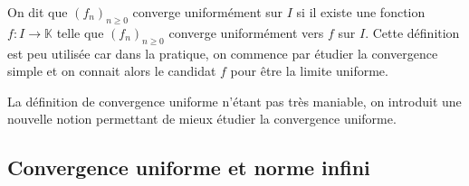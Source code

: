 \documentclass[a4paper,10pt]{report}
\begin{document}
\newpage

$\phantom{test}$

\vspace{3cm}

\begin{rem} On dit que $(f_n)_{n \geq 0}$ converge uniformément sur $I$ si il existe une fonction $f : I \rightarrow \mathbb{K}$ telle que $(f_n)_{n \geq 0}$ converge uniformément vers $f$ sur $I$. Cette définition est peu utilisée car dans la pratique, on commence par étudier la convergence simple et on connait alors le candidat $f$ pour être la limite uniforme.
\end{rem}

\medskip

\noindent La définition de convergence uniforme n'étant pas très maniable, on introduit une nouvelle notion permettant de mieux étudier la convergence uniforme.

\subsection{Convergence uniforme et norme infini}
%
%
%
\end{document}
